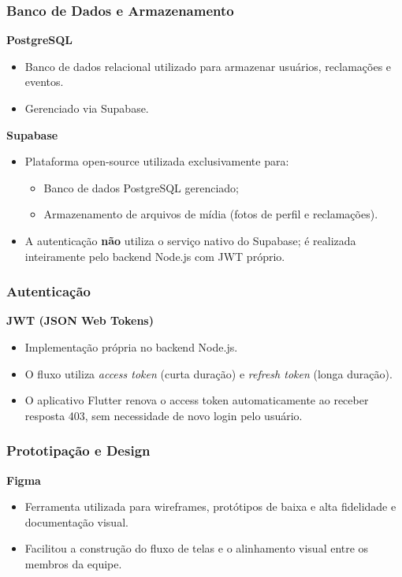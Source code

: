 \subsubsection{Banco de Dados e Armazenamento}

\textbf{PostgreSQL}
\begin{itemize}
  \item Banco de dados relacional utilizado para armazenar usuários, reclamações
        e eventos.
  \item Gerenciado via Supabase.
\end{itemize}

\textbf{Supabase}
\begin{itemize}
  \item Plataforma open-source utilizada exclusivamente para:
  \begin{itemize}
    \item Banco de dados PostgreSQL gerenciado;
    \item Armazenamento de arquivos de mídia (fotos de perfil e reclamações).
  \end{itemize}
  \item A autenticação \textbf{não} utiliza o serviço nativo do Supabase; é
        realizada inteiramente pelo backend Node.js com JWT próprio.
\end{itemize}

\subsubsection{Autenticação}

\textbf{JWT (JSON Web Tokens)}
\begin{itemize}
  \item Implementação própria no backend Node.js.
  \item O fluxo utiliza \textit{access token} (curta duração) e
        \textit{refresh token} (longa duração).
  \item O aplicativo Flutter renova o access token automaticamente ao receber
        resposta 403, sem necessidade de novo login pelo usuário.
\end{itemize}

\subsubsection{Prototipação e Design}

\textbf{Figma}
\begin{itemize}
  \item Ferramenta utilizada para wireframes, protótipos de baixa e alta
        fidelidade e documentação visual.
  \item Facilitou a construção do fluxo de telas e o alinhamento visual entre
        os membros da equipe.
\end{itemize}

